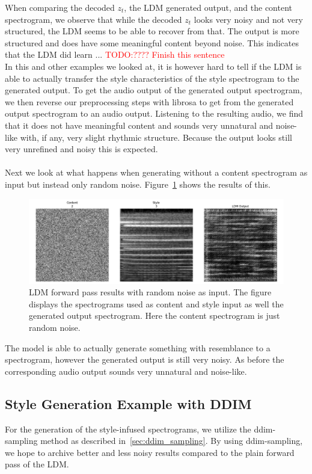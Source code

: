 When comparing the decoded \(z_t\), the LDM generated output, and the content spectrogram, we observe that while the decoded \(z_t\) looks very noisy and not very structured,
the LDM seems to be able to recover from that. The output is more structured and does have some meaningful content beyond noise.
This indicates that the LDM did learn ... \textcolor{red}{TODO:???? Finish this sentence}\\

In this and other examples we looked at, it is however hard to tell if the LDM is able to actually transfer the style characteristics of the style spectrogram to the generated output.
To get the audio output of the generated output spectrogram, we then reverse our preprocessing steps with librosa to get from the generated output spectrogram to an audio output.
Listening to the resulting audio, 
we find that it does not have meaningful content and sounds very unnatural and noise-like with, if any, very slight rhythmic structure.
Because the output looks still very unrefined and noisy this is expected.
\\\\
Next we look at what happens when generating without a content spectrogram as input but instead only random noise.
Figure~\ref{fig:ldm_forward_pass_random} shows the results of this.
\begin{figure}[h]
    \centering
    \includegraphics[width=\textwidth]{figures/test_ldm_forward_function_no_content_output_200ep.png}
    \caption{LDM forward pass results with random noise as input.
    The figure displays the spectrograms used as content and style input as well the generated output spectrogram. Here the content spectrogram is just random noise.}
    \label{fig:ldm_forward_pass_random}
\end{figure}
The model is able to actually generate something with resemblance to a spectrogram, however the generated output is still very noisy.
As before the corresponding audio output sounds very unnatural and noise-like.

\subsection{Style Generation Example with DDIM}
For the generation of the style-infused spectrograms, we utilize the ddim-sampling method as described in~\ref{sec:ddim_sampling}.
By using ddim-sampling, we hope to archive better and less noisy results compared to the plain forward pass of the LDM.

